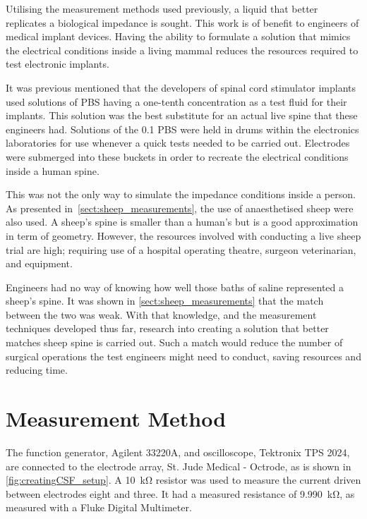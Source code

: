 
Utilising the measurement methods used previously, a liquid that better replicates a biological impedance is sought.
This work is of benefit to engineers of medical implant devices.
Having the ability to formulate a solution that mimics the electrical conditions inside a living mammal reduces the resources required to test electronic implants.

It was previous mentioned that the developers of spinal cord stimulator implants used solutions of PBS having a one-tenth concentration as a test fluid for their implants.
This solution was the best substitute for an actual live spine that these engineers had.
Solutions of the \SI{0.1}{\times} PBS were held in drums within the electronics laboratories for use whenever a quick tests needed to be carried out.
Electrodes were submerged into these buckets in order to recreate the electrical conditions inside a human spine.

This was not the only way to simulate the impedance conditions inside a person.
As presented in~\cref{sect:sheep_measurements}, the use of anaesthetised sheep were also used.
A sheep's spine is smaller than a human's but is a good approximation in term of geometry.
However, the resources involved with conducting a live sheep trial are high; requiring use of a hospital operating theatre, surgeon veterinarian, and equipment.

Engineers had no way of knowing how well those baths of saline represented a sheep's spine.
It was shown in \cref{sect:sheep_measurements} that the match between the two was weak.
With that knowledge, and the measurement techniques developed thus far, research into creating a solution that better matches sheep spine is carried out.
Such a match would reduce the number of surgical operations the test engineers might need to conduct, saving resources and reducing time.


\section{Measurement Method}


  The function generator, Agilent 33220A, and oscilloscope, Tektronix TPS 2024, are connected to the electrode array, St. Jude Medical - Octrode, as is shown in \cref{fig:creatingCSF_setup}.
  A \SI{10}{\kilo\ohm} resistor was used to measure the current driven between electrodes eight and three.
  It had a measured resistance of \SI{9.990}{\kilo\ohm}, as measured with a Fluke Digital Multimeter.
  

